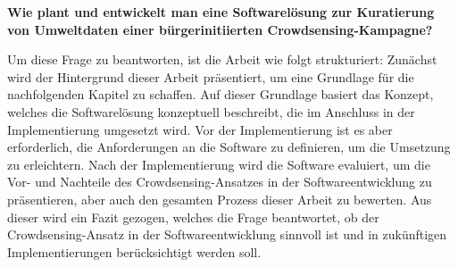 \textbf{Wie plant und entwickelt man eine Softwarelösung zur Kuratierung von Umweltdaten einer bürgerinitiierten Crowdsensing-Kampagne?} 


Um diese Frage zu beantworten, ist die Arbeit wie folgt strukturiert: Zunächst wird der Hintergrund dieser Arbeit präsentiert, um eine Grundlage für die nachfolgenden Kapitel zu schaffen. Auf dieser Grundlage basiert das Konzept, welches die Softwarelösung konzeptuell beschreibt, die im Anschluss in der Implementierung umgesetzt wird. Vor der Implementierung ist es aber erforderlich, die Anforderungen an die Software zu definieren, um die Umsetzung zu erleichtern. Nach der Implementierung wird die Software evaluiert, um die Vor- und Nachteile des Crowdsensing-Ansatzes in der Softwareentwicklung zu präsentieren, aber auch den gesamten Prozess dieser Arbeit zu bewerten. Aus dieser wird ein Fazit gezogen, welches die Frage beantwortet, ob der Crowdsensing-Ansatz in der Softwareentwicklung sinnvoll ist und in zukünftigen Implementierungen berücksichtigt werden soll.